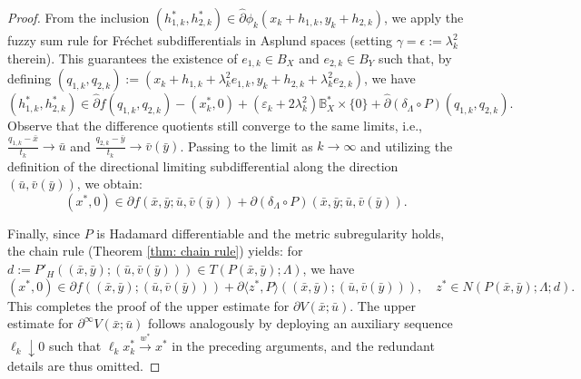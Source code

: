 \documentclass[12pt,twoside,reqno]{amsart}
\theoremstyle{definition}
\numberwithin{equation}{section}
\begin{document}
\begin{proof}
From the inclusion $(h_{1,k}^*, h_{2,k}^*) \in \hat{\partial} \phi_k(x_k + h_{1,k}, y_k + h_{2,k})$, we apply the fuzzy sum rule for Fr\'echet subdifferentials in Asplund spaces \cite[Theorem~2.33(b)]{Mordukhovich2006variational} (setting $\gamma=\epsilon := \lambda_k^2$ therein). This guarantees the existence of $e_{1,k} \in B_X$ and $e_{2,k} \in B_Y$ such that, by defining $(q_{1,k}, q_{2,k}) := (x_k + h_{1,k} + \lambda_k^2 e_{1,k}, y_k + h_{2,k} + \lambda_k^2 e_{2,k})$, we have 
\begin{equation*}
    (h_{1,k}^*, h_{2,k}^*) \in \hat{\partial} f(q_{1,k}, q_{2,k}) - (x_k^*, 0) + (\varepsilon_k + 2\lambda_k^2) \mathbb{B}^*_X \times \{0\} + \hat{\partial}(\delta_\Lambda \circ P)(q_{1,k}, q_{2,k}).
\end{equation*}
Observe that the difference quotients still converge to the same limits, i.e., $\frac{q_{1,k} - \bar{x}}{t_k} \to \bar{u}$ and $\frac{q_{2,k} - \bar{y}}{t_k} \to \bar{v}(\bar{y})$. 
Passing to the limit as $k \to \infty$ and utilizing the definition of the directional limiting subdifferential along the direction $(\bar{u}, \bar{v}(\bar{y}))$, we obtain: 
\begin{equation*}
    (x^*, 0) \in \partial f(\bar{x}, \bar{y}; \bar{u}, \bar{v}(\bar{y})) + \partial(\delta_\Lambda \circ P)(\bar{x}, \bar{y}; \bar{u}, \bar{v}(\bar{y})).
\end{equation*}

Finally, since $P$ is Hadamard differentiable and the metric subregularity holds, the chain rule (Theorem \ref{thm: chain rule}) yields: for $d := P'_H((\bar{x}, \bar{y}); (\bar u, \bar v(\bar{y}))) \in T(P(\bar{x}, \bar{y});\Lambda)$, we have 
\begin{equation*}
    (x^*, 0) \in \partial f((\bar{x}, \bar{y}); (\bar u, \bar v(\bar y))) + \partial \langle z^*, P \rangle((\bar{x}, \bar{y}); (\bar u, \bar v(\bar y))), \quad z^* \in N(P(\bar{x}, \bar{y}); \Lambda; d).
\end{equation*}
This completes the proof of the upper estimate for \(\partial V(\bar{x}; \bar{u})\). The upper estimate for \(\partial^\infty V(\bar{x}; \bar{u})\) follows analogously by deploying an auxiliary sequence \(\ell_k \downarrow 0\) such that \(\ell_k x_k^* \xrightarrow{w^*} x^*\) in the preceding arguments, and the redundant details are thus omitted. 
\end{proof}
\end{document}
